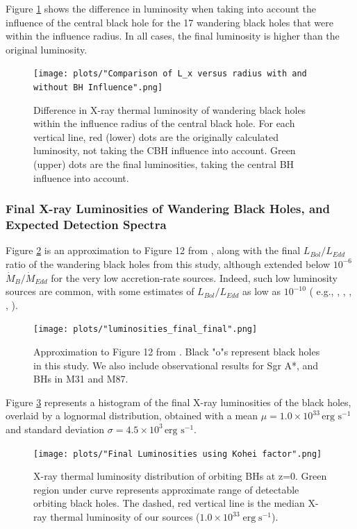 \documentclass[fleqn,usenatbib,useAMS]{mnras}
\begin{document}
Figure \ref{fig:wui} shows the difference in luminosity when taking into account the influence of the central black hole for the 17 wandering black holes that were within the influence radius.  In all cases, the final luminosity is higher than the original luminosity.
\begin{figure}
\begin{center}
\texttt{[image: plots/"Comparison of L\_x versus radius with and without BH Influence".png]}
\caption{Difference in X-ray thermal luminosity of wandering black holes within the influence radius of the central black hole.  For each vertical line, red (lower) dots are the originally calculated luminosity, not taking the CBH influence into account.  Green (upper) dots are the final luminosities, taking the central BH influence into account.}
\label{fig:wui}
\end{center}
\end{figure}

\subsubsection{Final X-ray Luminosities of Wandering Black Holes, and Expected Detection Spectra}
Figure \ref{fig:loobhs} is an approximation to Figure 12 from \cite{2019MNRAS.486.5377I}, along with the final $L_{Bol}/L_{Edd}$ ratio of the wandering black holes from this study, although extended below $10^{-6}$ $\dot{M}_{B}/\dot{M}_{Edd}$ for the very low accretion-rate sources.  Indeed, such low luminosity sources are common, with some estimates of $L_{Bol}/L_{Edd}$ as low as $10^{-10}$ ( e.g., \citealt{2003ApJ...598..301Y}, \citealt{2004ApJ...613..322Q}, \citealt{2008ARA&A..46..475H}, \citealt{2009ApJ...699..626H}, \citealt{2018MNRAS.476.1412I}).
\begin{figure}
\begin{center}
\texttt{[image: plots/"luminosities\_final\_final".png]}
\caption{Approximation to Figure 12 from \citealt{2019MNRAS.486.5377I}. Black "o"s represent black holes in this study.  We also include observational results for Sgr A*, and BHs in M31 and M87.}
\label{fig:loobhs}
\end{center}
\end{figure}

Figure \ref{fig:ldobhs} represents a histogram of the final X-ray luminosities of the black holes, overlaid by a lognormal distribution, obtained with a mean $\mu=1.0\times10^{33}\,\text{erg s}^{-1}$ and standard deviation $\sigma=4.5\times10^{3}\,\text{erg s}^{-1}$.
\begin{figure}
\begin{center}
\texttt{[image: plots/"Final Luminosities using Kohei factor".png]}
\caption{X-ray thermal luminosity distribution of orbiting BHs at z=0.  Green region under curve represents approximate range of detectable orbiting black holes. The dashed, red vertical line is the median X-ray thermal luminosity of our sources ($1.0\times10^{33}\;\text{erg}\;\text{s}^{-1}$).}
\label{fig:ldobhs}
\end{center}
\end{figure}
\end{document}
